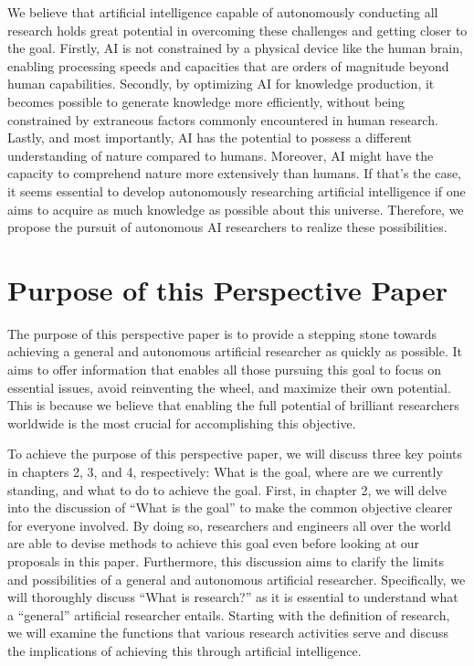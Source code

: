 \documentclass{book}
\begin{document}
We believe that artificial intelligence capable of autonomously conducting all research holds great potential in overcoming these challenges and getting closer to the goal. Firstly, AI is not constrained by a physical device like the human brain, enabling processing speeds and capacities that are orders of magnitude beyond human capabilities. Secondly, by optimizing AI for knowledge production, it becomes possible to generate knowledge more efficiently, without being constrained by extraneous factors commonly encountered in human research. Lastly, and most importantly, AI has the potential to possess a different understanding of nature compared to humans. Moreover, AI might have the capacity to comprehend nature more extensively than humans. If that's the case, it seems essential to develop autonomously researching artificial intelligence if one aims to acquire as much knowledge as possible about this universe. Therefore, we propose the pursuit of autonomous AI researchers to realize these possibilities.

\section{Purpose of this Perspective Paper}
The purpose of this perspective paper is to provide a stepping stone towards achieving a general and autonomous artificial researcher as quickly as possible. It aims to offer information that enables all those pursuing this goal to focus on essential issues, avoid reinventing the wheel, and maximize their own potential. This is because we believe that enabling the full potential of brilliant researchers worldwide is the most crucial for accomplishing this objective.

To achieve the purpose of this perspective paper, we will discuss three key points in chapters 2, 3, and 4, respectively: What is the goal, where are we currently standing, and what to do to achieve the goal. First, in chapter 2, we will delve into the discussion of ``What is the goal'' to make the common objective clearer for everyone involved. By doing so, researchers and engineers all over the world are able to devise methods to achieve this goal even before looking at our proposals in this paper. Furthermore, this discussion aims to clarify the limits and possibilities of a general and autonomous artificial researcher. Specifically, we will thoroughly discuss ``What is research?'' as it is essential to understand what a ``general'' artificial researcher entails. Starting with the definition of research, we will examine the functions that various research activities serve and discuss the implications of achieving this through artificial intelligence.
\end{document}
